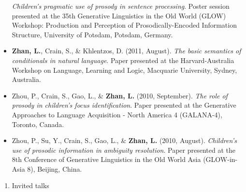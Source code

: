 \documentclass[12pt,]{article}
\providecommand{\tightlist}{%
  \setlength{\itemsep}{0pt}\setlength{\parskip}{0pt}}
\begin{document}
\begin{itemize}
  \emph{Children's pragmatic use of prosody in sentence processing}.
  Poster session presented at the 35th Generative Linguistics in the Old
  World (GLOW) Workshop: Production and Perception of
  Prosodically-Encoded Information Structure, University of Potsdam,
  Potsdam, Germany.
\item
  \textbf{Zhan, L.}, Crain, S., \& Khlentzos, D. (2011, August).
  \emph{The basic semantics of conditionals in natural language}. Paper
  presented at the Harvard-Australia Workshop on Language, Learning and
  Logic, Macquarie University, Sydney, Australia.
\item
  Zhou, P., Crain, S., Gao, L., \& \textbf{Zhan, L.} (2010, September).
  \emph{The role of prosody in children's focus identification}. Paper
  presented at the Generative Approaches to Language Acquisition - North
  America 4 (GALANA-4), Toronto, Canada.
\item
  Zhou, P., Su, Y., Crain, S., Gao, L., \& \textbf{Zhan, L.} (2010,
  August). \emph{Children's use of prosodic information in ambiguity
  resolution}. Paper presented at the 8th Conference of Generative
  Linguistics in the Old World Asia (GLOW-in-Asia 8), Beijing, China.
\end{itemize}

\begin{enumerate}
\def\labelenumi{\arabic{enumi}.}
\setcounter{enumi}{4}
\tightlist
\item
  Invited talks
\end{enumerate}
\end{document}
